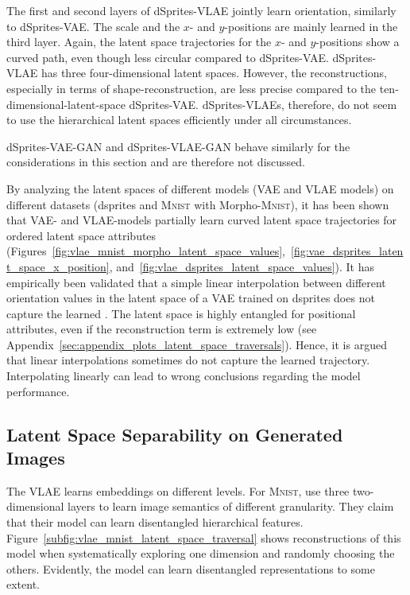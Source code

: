 The first and second layers of dSprites-\ac{VLAE} jointly learn orientation, similarly to dSprites-\ac{VAE}.
The scale and the $x$- and $y$-positions are mainly learned in the third layer.
Again, the latent space trajectories for the $x$- and $y$-positions show a curved path, even though less circular compared to dSprites-\ac{VAE}.
dSprites-\ac{VLAE} has three four-dimensional latent spaces.
However, the reconstructions, especially in terms of shape-reconstruction, are less precise compared to the ten-dimensional-latent-space dSprites-\ac{VAE}.
dSprites-\acp{VLAE}, therefore, do not seem to use the hierarchical latent spaces efficiently under all circumstances.

dSprites-\ac{VAE}-\ac{GAN} and dSprites-\ac{VLAE}-\ac{GAN} behave similarly for the considerations in this section and are therefore not discussed.

By analyzing the latent spaces of different models (\ac{VAE} and \ac{VLAE} models) on different datasets (dsprites and \textsc{Mnist} with Morpho-\textsc{Mnist}), it has been shown that \ac{VAE}- and \ac{VLAE}-models partially learn curved latent space trajectories for ordered latent space attributes (Figures~\ref{fig:vlae_mnist_morpho_latent_space_values},~\ref{fig:vae_dsprites_latent_space_x_position}, and~\ref{fig:vlae_dsprites_latent_space_values}).
It has empirically been validated that a simple linear interpolation between different orientation values in the latent space of a \ac{VAE} trained on dsprites does not capture the learned .
The latent space is highly entangled for positional attributes, even if the reconstruction term is extremely low (see Appendix~\ref{sec:appendix_plots_latent_space_traversals}).
Hence, it is argued that linear interpolations sometimes do not capture the learned trajectory.
Interpolating linearly can lead to wrong conclusions regarding the model performance.


\subsection{Latent Space Separability on Generated Images}\label{subsec:independence-of-vlae-embeddings}

The VLAE learns embeddings on different levels.
For \textsc{Mnist}, \citet{zhao2017learning} use three two-dimensional layers to learn image semantics of different granularity.
They claim that their model can learn disentangled hierarchical features.
Figure~\ref{subfig:vlae_mnist_latent_space_traversal} shows reconstructions of this model when systematically exploring one dimension and randomly choosing the others.
Evidently, the model can learn disentangled representations to some extent.

